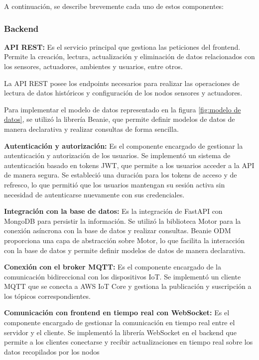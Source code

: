 A continuación, se describe brevemente cada uno de estos componentes:

\subsubsection{Backend}


\textbf{API REST:} Es el servicio principal que gestiona las peticiones del frontend. Permite la
creación, lectura, actualización y eliminación de datos relacionados con los
sensores, actuadores, ambientes y usuarios, entre otros.

La API REST posee los endpoints necesarios para realizar las operaciones de
lectura de datos históricos y configuración de los nodos sensores y actuadores.

Para implementar el modelo de datos representado en la figura \ref{fig:modelo
    de datos}, se utilizó la librería Beanie, que permite definir modelos de datos
de manera declarativa y realizar consultas de forma sencilla.

\textbf{Autenticación y autorización:} Es el componente encargado de gestionar
la autenticación y autorización de los usuarios. Se implementó un sistema de
autenticación basado en tokens JWT, que permite a los usuarios acceder a la
API de manera segura. Se estableció una duración para los tokens de acceso y de
refresco, lo que permitió que los usuarios mantengan su sesión activa sin
necesidad de autenticarse nuevamente con sus credenciales.

\textbf{Integración con la base de datos:} Es la integración de FastAPI con MongoDB
para persistir la información. Se utilizó la biblioteca Motor para la conexión
asíncrona con la base de datos y realizar consultas. Beanie ODM proporciona una capa
de abstracción sobre Motor, lo que facilita la interacción con la base de datos y
permite definir modelos de datos de manera declarativa.

\textbf{Conexión con el broker MQTT:} Es el componente encargado de la comunicación
bidireccional con los dispositivos IoT. Se implementó un cliente MQTT que se conecta
a AWS IoT Core y gestiona la publicación y suscripción a los tópicos correspondientes.

\textbf{Comunicación con frontend en tiempo real con WebSocket:} Es el componente
encargado de gestionar la comunicación en tiempo real entre el servidor y el cliente.
Se implementó la librería WebSocket en el backend que permite a los clientes conectarse
y recibir actualizaciones en tiempo real sobre los datos recopilados por los nodos

